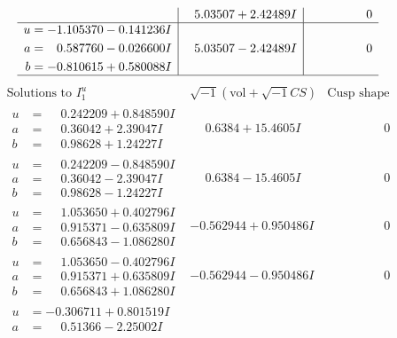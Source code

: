 \documentclass[1p]{elsarticle_modified}
\theoremstyle{definition}
\newcommand{\I}{\sqrt{-1}}
\begin{document}
$$\begin{array}{c|c|c}
 & \phantom{-}5.03507 + 2.42489 I & \phantom{-0.000000 } 0 \\ \hline\begin{aligned}
u &= -1.105370 - 0.141236 I \\
a &= \phantom{-}0.587760 - 0.026600 I \\
b &= -0.810615 + 0.580088 I\end{aligned}
 & \phantom{-}5.03507 - 2.42489 I & \phantom{-0.000000 } 0\\
 \hline 
 \end{array}$$\newpage$$\begin{array}{c|c|c}  
\text{Solutions to }I^u_{1}& \I (\text{vol} + \sqrt{-1}CS) & \text{Cusp shape}\\
 \hline 
\begin{aligned}
u &= \phantom{-}0.242209 + 0.848590 I \\
a &= \phantom{-}0.36042 + 2.39047 I \\
b &= \phantom{-}0.98628 + 1.24227 I\end{aligned}
 & \phantom{-}0.6384 + 15.4605 I & \phantom{-0.000000 } 0 \\ \hline\begin{aligned}
u &= \phantom{-}0.242209 - 0.848590 I \\
a &= \phantom{-}0.36042 - 2.39047 I \\
b &= \phantom{-}0.98628 - 1.24227 I\end{aligned}
 & \phantom{-}0.6384 - 15.4605 I & \phantom{-0.000000 } 0 \\ \hline\begin{aligned}
u &= \phantom{-}1.053650 + 0.402796 I \\
a &= \phantom{-}0.915371 - 0.635809 I \\
b &= \phantom{-}0.656843 - 1.086280 I\end{aligned}
 & -0.562944 + 0.950486 I & \phantom{-0.000000 } 0 \\ \hline\begin{aligned}
u &= \phantom{-}1.053650 - 0.402796 I \\
a &= \phantom{-}0.915371 + 0.635809 I \\
b &= \phantom{-}0.656843 + 1.086280 I\end{aligned}
 & -0.562944 - 0.950486 I & \phantom{-0.000000 } 0 \\ \hline\begin{aligned}
u &= -0.306711 + 0.801519 I \\
a &= \phantom{-}0.51366 - 2.25002 I \\

\end{aligned}
\end{array}$$
\end{document}
